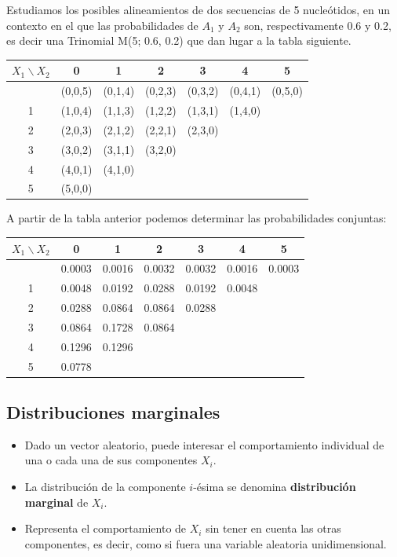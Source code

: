 \documentclass[
]{article}
\begin{document}
Estudiamos los posibles alineamientos de dos secuencias de 5 nucleótidos, en un contexto en el que las probabilidades de \(A_1\) y \(A_2\) son, respectivamente 0.6 y 0.2, es decir una Trinomial M(5; 0.6, 0.2) que dan lugar a la tabla siguiente.

\begin{longtable}[]{@{}ccccccc@{}}
\toprule\noalign{}
\(X_{1} \backslash X_{2}\) & 0 & 1 & 2 & 3 & 4 & 5 \\
\midrule\noalign{}
\endhead
\bottomrule\noalign{}
\endlastfoot
0 & (0,0,5) & (0,1,4) & (0,2,3) & (0,3,2) & (0,4,1) & (0,5,0) \\
1 & (1,0,4) & (1,1,3) & (1,2,2) & (1,3,1) & (1,4,0) & \\
2 & (2,0,3) & (2,1,2) & (2,2,1) & (2,3,0) & & \\
3 & (3,0,2) & (3,1,1) & (3,2,0) & & & \\
4 & (4,0,1) & (4,1,0) & & & & \\
5 & (5,0,0) & & & & & \\
\end{longtable}

A partir de la tabla anterior podemos determinar las probabilidades conjuntas:

\begin{longtable}[]{@{}ccccccc@{}}
\toprule\noalign{}
\(X_{1} \backslash X_{2}\) & 0 & 1 & 2 & 3 & 4 & 5 \\
\midrule\noalign{}
\endhead
\bottomrule\noalign{}
\endlastfoot
0 & 0.0003 & 0.0016 & 0.0032 & 0.0032 & 0.0016 & 0.0003 \\
1 & 0.0048 & 0.0192 & 0.0288 & 0.0192 & 0.0048 & \\
2 & 0.0288 & 0.0864 & 0.0864 & 0.0288 & & \\
3 & 0.0864 & 0.1728 & 0.0864 & & & \\
4 & 0.1296 & 0.1296 & & & & \\
5 & 0.0778 & & & & & \\
\end{longtable}

\subsection{Distribuciones marginales}\label{distribuciones-marginales}

\begin{itemize}
\item
  Dado un vector aleatorio, puede interesar el comportamiento individual de una o cada una de sus componentes \(X_i\).
\item
  La distribución de la componente \(i\)-ésima se denomina \textbf{distribución marginal} de \(X_i\).
\item
  Representa el comportamiento de \(X_i\) sin tener en cuenta las otras componentes, es decir, como si fuera una variable aleatoria unidimensional.
\end{itemize}
\end{document}
